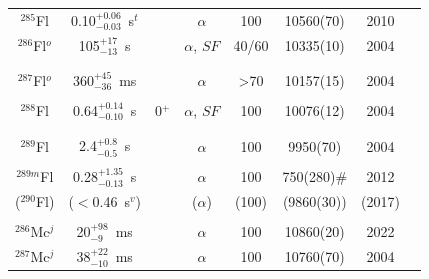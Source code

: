 \begin{center}
\begin{longtable}{c|ccccccl}
$^{285}$Fl	& 0.10$^{+0.06}_{-0.03}$~s$^t$& &$\alpha$		&100		&10560(70)		    &2010	&{\tiny\cite{Ellison2010,Utyonkov2015,Oganessian2017,Utyonkov2018}}\\
$^{286}$Fl$^o$	& 105$^{+17}_{-13}$~s& 	&$\alpha$, $SF$		&40/60		&10335(10)		    &2004	&{\tiny\cite{Oganessian2004,Oganessian2004a,Oganessian2005a,Oganessian2006,Stavsetra2009,Ellison2010}}\\
			&				&			&					&			& 				    &		&{\tiny\cite{Oganessian2011a,Oganessian2012a,Oganessian2015,Oganessian2017,Samark-Roth2021,Samark-Roth2023}}\\
			&				&			&					&			& 				    &		&{\tiny\cite{Oganessian2022b,Gates2024}}\\
$^{287}$Fl$^o$& 360$^{+45}_{-36}$~ms&   &$\alpha$			&>70		&10157(15)		    &2004	&{\tiny\cite{Oganessian2004,Oganessian2004a,Oganessian2006,Stavsetra2009,Oganessian2011a,Oganessian2015}}\\
			&				&			&					&			& 				    &		&{\tiny\cite{Oganessian2017,Oganessian2022b}}\\
$^{288}$Fl	& 0.64$^{+0.14}_{-0.10}$~s&0$^+$&$\alpha$, $SF$	&100		&10076(12)     		&2004	&{\tiny\cite{Oganessian2004,Oganessian2004a,Oganessian2005a,Duellmann2010,Eichler2010,Gates2011}}\\
			&				&			&					&			& 				    &		&{\tiny\cite{Oganessian2011a,Hofmann2012,Morita2014,Yakushev2014,Oganessian2015,Kaji2017}}\\
			&				&			&					&			& 				    &		&{\tiny\cite{Oganessian2017,Samark-Roth2021,Samark-Roth2023}}\\
$^{289}$Fl	& 2.4$^{+0.8}_{-0.5}$~s&	&$\alpha$			&100		&9950(70)			&2004	&{\tiny\cite{Oganessian2004,Oganessian2004a,Oganessian2004c,Oganessian2004d,Oganessian2011a,Hofmann2012}}\\
			&				&			&					&			& 				    &		&{\tiny\cite{Oganessian2015,Oganessian2017,Cox2023}}\\
$^{289m}$Fl	& 0.28$^{+1.35}_{-0.13}$~s&	&$\alpha$			&100		&750(280)\#			&2012	&{\tiny\cite{Hofmann2012}}\\
($^{290}$Fl)&($<$0.46~s$^v$)&			&($\alpha$)			&(100)		&(9860(30))			&(2017)	&{\tiny\cite{Kaji2017}}\\
\hline\\
$^{286}$Mc$^j$& 20$^{+98}_{-9}$~ms& 	&$\alpha$			&100		&10860(20)		    &2022	&{\tiny\cite{Oganessian2022d}}\\
$^{287}$Mc$^j$& 38$^{+22}_{-10}$~ms& 			&$\alpha$	&100		&10760(70)		    &2004	&{\tiny\cite{Oganessian2003,Oganessian2004b,Rudolph2013,Oganessian2015,Forsberg2016,Forsberg2016a}}\\

\end{longtable}
\end{center}
